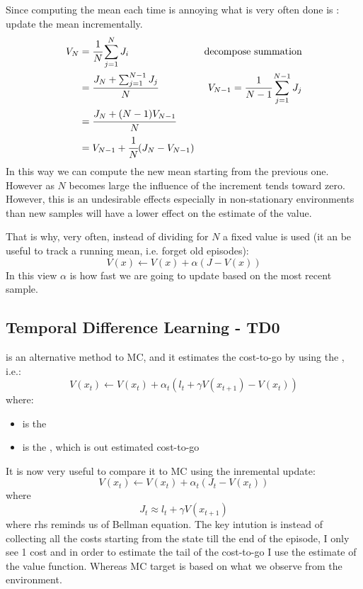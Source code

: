 Since computing the mean each time is annoying what is very often done is : update the mean incrementally.
\begin{align*}
V_N &= \cfrac{1}{N}\sum_{j=1}^N J_i&\text{decompose summation}\\
&=  \cfrac{J_N +\sum_{j=1}^{N-1} J_j}{N}&V_{N-1} = \cfrac{1}{N-1}\sum_{j=1}^{N-1} J_j\\
&= \cfrac{J_N + (N-1)V_{N-1}}{N}\\
&= V_{N-1} + \cfrac{1}{N}(J_N - V_{N-1})  
\end{align*}
In this way we can compute the new mean starting from the previous one.
However as $N$ becomes large the influence of the increment tends toward zero. However, this is an undesirable effects especially in non-stationary environments than new samples will have a lower effect on the estimate of the value.

That is why, very often, instead of dividing for $N$ a fixed value is used (it an be useful to track a running mean, i.e. forget old episodes):
\[V(x) \leftarrow V(x) + \alpha (J - V(x))\]
In this view $\alpha$ is how fast we are going to update based on the most recent sample.

\subsection{Temporal Difference Learning - TD0}
 is an alternative method to MC, and it estimates the cost-to-go by using the , i.e.:
\[V(x_t) \leftarrow V(x_t) + \alpha_t (l_t + \gamma V(x_{t+1}) - V(x_t))\]
where:
\begin{itemize}
\item{ is the }
\item{ is the }, which is out estimated cost-to-go
\end{itemize}

It is now very useful to compare it to MC using the inremental update:
\[V(x_t) \leftarrow V(x_t) + \alpha_t (J_t - V(x_t))\]
where 
\[J_t \approx l_t + \gamma V(x_{t+1})\]
where rhs reminds us of Bellman equation.
The key intution is instead of collecting all the costs starting from the state till the end of the episode, I only see 1 cost and in order to estimate the tail of the cost-to-go I use the estimate of the value function.
Whereas MC target is based on what we observe from the environment.

